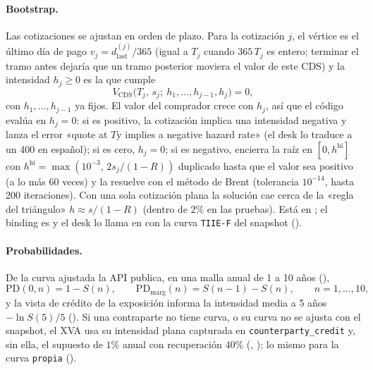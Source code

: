 \begin{sloppypar}
\paragraph{Bootstrap.} Las cotizaciones se ajustan en orden de plazo. Para la cotización $j$, el vértice es el último
día de pago $v_j=d^{(j)}_{\mathrm{last}}/365$ (igual a $T_j$ cuando $365\,T_j$ es entero; terminar el tramo antes
dejaría que un tramo posterior moviera el valor de este CDS) y la intensidad $h_j\ge0$ es la que cumple
\begin{equation}\label{eq:cap14-bootstrap}
  V_{\mathrm{CDS}}\bigl(T_j,\,s_j;\ h_1,\dots,h_{j-1},h_j\bigr)=0,
\end{equation}
con $h_1,\dots,h_{j-1}$ ya fijos. El valor del comprador crece con $h_j$, así que el código evalúa en
$h_j=0$: si es positivo, la cotización implica una intensidad negativa y lanza el error
«quote at $T$y implies a negative hazard rate» (el desk lo traduce a un 400 en español); si es cero, $h_j=0$; si es
negativo, encierra la raíz en $[0,h^{\mathrm{hi}}]$ con $h^{\mathrm{hi}}=\max(10^{-3},\,2s_j/(1-R))$ duplicado hasta
que el valor sea positivo (a lo más 60 veces) y la resuelve con el método de Brent (tolerancia $10^{-14}$, hasta 200
iteraciones). Con una sola cotización plana la solución cae cerca de la «regla del triángulo»
$h\approx s/(1-R)$ (dentro de $2\%$ en las pruebas). Está en
; el binding es
 y el desk lo llama en
 con la curva \texttt{TIIE-F} del snapshot
().

\paragraph{Probabilidades.} De la curva ajustada la API publica, en una malla anual de 1 a 10 años
(),
\begin{equation}\label{eq:cap14-pd}
  \mathrm{PD}(0,n)=1-S(n),\qquad \mathrm{PD}_{\mathrm{marg}}(n)=S(n-1)-S(n),\qquad n=1,\dots,10,
\end{equation}
y la vista de crédito de la exposición informa la intensidad media a 5 años $-\ln S(5)/5$
(). Si una contraparte no tiene curva, o su curva no se ajusta con el
snapshot, el XVA usa su intensidad plana capturada en \texttt{counterparty\_credit} y, sin ella, el supuesto de $1\%$
anual con recuperación $40\%$ (,
); lo mismo para la curva \texttt{propia}
().


\end{sloppypar}
